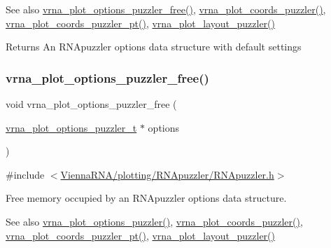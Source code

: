 \begin{DoxySeeAlso}{See also}
\mbox{\hyperlink{group__plot__layout__utils_ga551344268c4245f3f75994a51c517a30}{vrna\+\_\+plot\+\_\+options\+\_\+puzzler\+\_\+free()}}, \mbox{\hyperlink{group__plot__layout__utils_gafd49896df8780c9669125429bc0da9b3}{vrna\+\_\+plot\+\_\+coords\+\_\+puzzler()}}, \mbox{\hyperlink{group__plot__layout__utils_gab50a90dd6000a1920d741537af7e0b24}{vrna\+\_\+plot\+\_\+coords\+\_\+puzzler\+\_\+pt()}}, \mbox{\hyperlink{group__plot__layout__utils_ga57f815d56c8c083c016381213f581f1e}{vrna\+\_\+plot\+\_\+layout\+\_\+puzzler()}}
\end{DoxySeeAlso}
\begin{DoxyReturn}{Returns}
An R\+N\+Apuzzler options data structure with default settings 
\end{DoxyReturn}
\mbox{\label{group__plot__layout__utils_ga551344268c4245f3f75994a51c517a30}} 
\subsubsection{\texorpdfstring{vrna\_plot\_options\_puzzler\_free()}{vrna\_plot\_options\_puzzler\_free()}}
{\footnotesize\ttfamily void vrna\+\_\+plot\+\_\+options\+\_\+puzzler\+\_\+free (\begin{DoxyParamCaption}\item[{\mbox{\hyperlink{group__plot__layout__utils_structvrna__plot__options__puzzler__t}{vrna\+\_\+plot\+\_\+options\+\_\+puzzler\+\_\+t}} $\ast$}]{options }\end{DoxyParamCaption})}



{\ttfamily \#include $<$\mbox{\hyperlink{RNApuzzler_8h}{Vienna\+R\+N\+A/plotting/\+R\+N\+Apuzzler/\+R\+N\+Apuzzler.\+h}}$>$}



Free memory occupied by an R\+N\+Apuzzler options data structure. 

\begin{DoxySeeAlso}{See also}
\mbox{\hyperlink{group__plot__layout__utils_ga838ff131d5430461d0c4c41c4aba45bc}{vrna\+\_\+plot\+\_\+options\+\_\+puzzler()}}, \mbox{\hyperlink{group__plot__layout__utils_gafd49896df8780c9669125429bc0da9b3}{vrna\+\_\+plot\+\_\+coords\+\_\+puzzler()}}, \mbox{\hyperlink{group__plot__layout__utils_gab50a90dd6000a1920d741537af7e0b24}{vrna\+\_\+plot\+\_\+coords\+\_\+puzzler\+\_\+pt()}}, \mbox{\hyperlink{group__plot__layout__utils_ga57f815d56c8c083c016381213f581f1e}{vrna\+\_\+plot\+\_\+layout\+\_\+puzzler()}}
\end{DoxySeeAlso}

